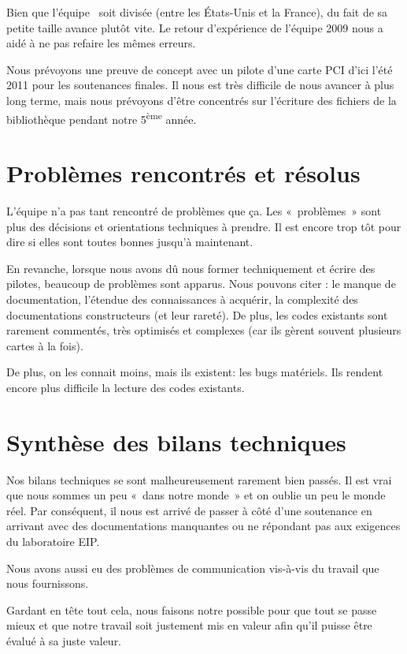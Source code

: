 \documentclass[francais]{rtxreport}
\begin{document}
Bien que l'équipe \rtx\ soit divisée (entre les États-Unis et la France), du
fait de sa petite taille avance plutôt vite. Le retour d'expérience de l'équipe
2009 nous a aidé à ne pas refaire les mêmes erreurs.

Nous prévoyons une preuve de concept avec un pilote d’une carte PCI d’ici l'été
2011 pour les soutenances finales. Il nous est très difficile de nous avancer à
plus long terme, mais nous prévoyons d’être concentrés sur l’écriture des
fichiers de la bibliothèque pendant notre 5\textsuperscript{ème} année.

\section{Problèmes rencontrés et résolus}

L’équipe n’a pas tant rencontré de problèmes que ça. Les «~problèmes~» sont plus
des décisions et orientations techniques à prendre. Il est encore trop tôt pour
dire si elles sont toutes bonnes jusqu’à maintenant.

En revanche, lorsque nous avons dû nous former techniquement et écrire des
pilotes, beaucoup de problèmes sont apparus. Nous pouvons citer : le manque de
documentation, l’étendue des connaissances à acquérir, la complexité des
documentations constructeurs (et leur rareté). De plus, les codes existants sont
rarement commentés, très optimisés et complexes (car ils gèrent souvent
plusieurs cartes à la fois).

De plus, on les connait moins, mais ils existent: les bugs matériels. Ils
rendent encore plus difficile la lecture des codes existants.

\section{Synthèse des bilans techniques}

Nos bilans techniques se sont malheureusement rarement bien passés. Il est vrai
que nous sommes un peu «~dans notre monde~» et on oublie un peu le monde réel.
Par conséquent, il nous est arrivé de passer à côté d’une soutenance en arrivant
avec des documentations manquantes ou ne répondant pas aux exigences du
laboratoire EIP.

Nous avons aussi eu des problèmes de communication vis-à-vis du travail que nous
fournissons.

Gardant en tête tout cela, nous faisons notre possible pour que tout se passe
mieux et que notre travail soit justement mis en valeur afin qu’il puisse être
évalué à sa juste valeur.
\end{document}
